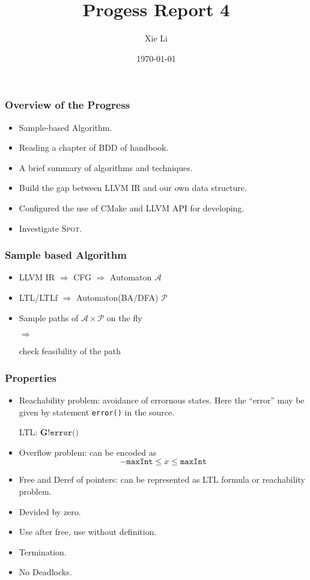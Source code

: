 \documentclass[11pt]{beamer}
\title{Progess Report 4}
\date{\today}
\author{Xie Li}
\begin{document}
\maketitle

\begin{frame}\frametitle{Overview of the Progress}
\begin{itemize}
\item Sample-based Algorithm.
\item Reading a chapter of BDD of handbook.
\item A brief summary of algorithms and techniques.
\item Build the gap between LLVM IR and our own data structure.
\item Configured the use of CMake and LLVM API for developing.
\item Investigate \textsc{Spot}.
\end{itemize}

\end{frame}

\begin{frame}\frametitle{Sample based Algorithm}

\begin{itemize}
\item LLVM IR $\Rightarrow$ CFG $\Rightarrow$ Automaton $\mathcal{A}$

\item LTL/LTLf $\Rightarrow$ Automaton(BA/DFA) $\mathcal{P}$

\item Sample paths of $\mathcal{A}\times \mathcal{P}$ on the fly 

$\Rightarrow$

check feasibility of the path


\end{itemize}

\end{frame}

\begin{frame}\frametitle{Properties}

\begin{itemize}
\item Reachability problem: avoidance of errornous states. Here the ``error'' may be given by statement \texttt{error()} in the source.

LTL: $\textbf{G} ! \texttt{error()}$


\item Overflow problem: can be encoded as 
\[-\texttt{maxInt}\le x \le \texttt{maxInt}\]

\item Free and Deref of pointers: can be represented as LTL formula or reachability problem.


\item Devided by zero.

\item Use after free, use without definition.


\item Termination.

\item No Deadlocks.
\end{itemize}
\end{frame}
\end{document}
